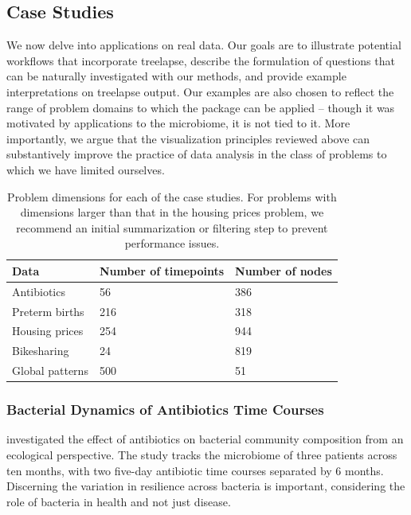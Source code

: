 \subsection{Case Studies}\label{case-studies}

We now delve into applications on real data. Our goals are to illustrate
potential workflows that incorporate treelapse, describe the formulation of
questions that can be naturally investigated with our methods, and provide
example interpretations on treelapse output. Our examples are also chosen to
reflect the range of problem domains to which the package can be applied --
though it was motivated by applications to the microbiome, it is not tied to it.
More importantly, we argue that the visualization principles reviewed above can
substantively improve the practice of data analysis in the class of problems to
which we have limited ourselves.

\begin{table}
\centering
\begin{tabular}{|l|l|l|}
  \hline
  Data            & Number of timepoints & Number of nodes \\
  \hline
  Antibiotics     & 56                 & 386             \\
  Preterm births  & 216                & 318             \\
  Housing prices  & 254                & 944             \\
  Bikesharing     & 24                 & 819             \\
  Global patterns & 500                & 51             \\
  \hline
\end{tabular}
\caption{Problem dimensions for each of the case studies. For problems with
  dimensions larger than that in the housing prices problem, we recommend an
  initial summarization or filtering step to prevent performance
  issues. \label{problem-scaling}}
\end{table}

\subsubsection{Bacterial Dynamics of Antibiotics Time
Courses}\label{bacterial-dynamics-of-antibiotics-time-courses}

\citet{dethlefsen2008pervasive} investigated the effect of antibiotics on
bacterial community composition from an ecological perspective. The study tracks
the microbiome of three patients across ten months, with two five-day antibiotic
time courses separated by 6 months. Discerning the variation in resilience
across bacteria is important, considering the role of bacteria in health and
not just disease.

